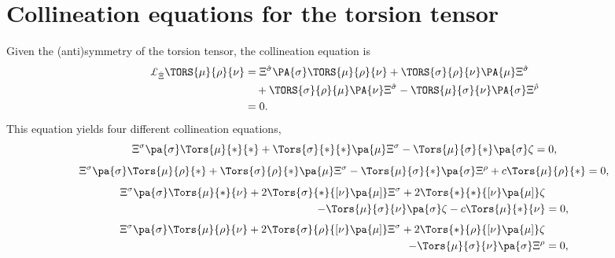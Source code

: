 \documentclass[aps,prd,12pt,superscriptaddress,showpacs,showkeys,reprint]{revtex4-1}
\begin{document}
\section{Collineation equations for the torsion tensor}

Given the (anti)symmetry of the torsion tensor, the collineation equation is
\begin{equation}
  \begin{split}
    \pounds_{\hat{\Xi}} \TORS{\mu}{\rho}{\nu} &= \Xi^{\hat{\sigma}} \PA{\sigma} \TORS{\mu}{\rho}{\nu} + \TORS{\sigma }{\rho}{\nu} \PA{\mu} \Xi^{\hat{\sigma}} \\
    & \quad + \TORS{\sigma }{\rho}{\mu} \PA{\nu} \Xi^{\hat{\sigma}}- \TORS{\mu}{\sigma}{\nu} \PA{\sigma} \Xi^{\hat{\rho}} \\
    &= 0.
  \end{split}
\end{equation}
This equation yields four different collineation equations,
\begin{equation}
    \Xi^\sigma \pa{\sigma} \Tors{\mu}{*}{*} + \Tors{\sigma}{*}{*} \pa{\mu} \Xi^\sigma - \Tors{\mu}{\sigma}{*} \pa{\sigma} \zeta = 0,
\end{equation}
\begin{equation}
  \Xi^\sigma \pa{\sigma} \Tors{\mu}{\rho}{*} + \Tors{\sigma}{\rho}{*} \pa{\mu} \Xi^\sigma - \Tors{\mu}{\sigma}{*} \pa{\sigma} \Xi^\rho + c \Tors{\mu}{\rho}{*} = 0,
\end{equation}
\begin{equation}
  \begin{split}
    \Xi^\sigma \pa{\sigma} \Tors{\mu}{*}{\nu} + 2 \Tors{\sigma}{*}{[\nu} \pa{\mu]} \Xi^\sigma + 2 \Tors{*}{*}{[\nu} \pa{\mu]} \zeta & \\
    - \Tors{\mu}{\sigma}{\nu} \pa{\sigma} \zeta - c \Tors{\mu}{*}{\nu} &= 0,
  \end{split}
\end{equation}
\begin{equation}
  \begin{split}
    \Xi^\sigma \pa{\sigma} \Tors{\mu}{\rho}{\nu} + 2 \Tors{\sigma}{\rho}{[\nu} \pa{\mu]} \Xi^\sigma + 2 \Tors{*}{\rho}{[\nu} \pa{\mu]} \zeta & \\
    - \Tors{\mu}{\sigma}{\nu} \pa{\sigma} \Xi^\rho &= 0,
  \end{split}  
\end{equation}



\end{document}

